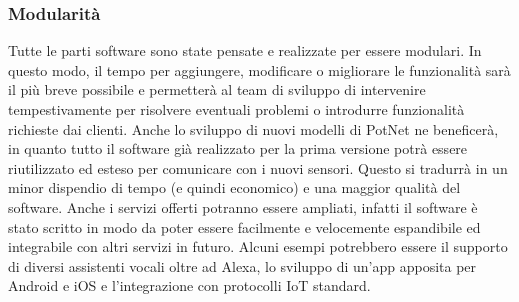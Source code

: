 \subsubsection{Modularità}

Tutte le parti software sono state pensate e realizzate per essere modulari. In questo modo, il tempo per aggiungere, modificare o migliorare le funzionalità sarà il più breve possibile e permetterà al team di sviluppo di intervenire tempestivamente per risolvere eventuali problemi o introdurre funzionalità richieste dai clienti.
\newline Anche lo sviluppo di nuovi modelli di PotNet ne beneficerà, in quanto tutto il software già realizzato per la prima versione potrà essere riutilizzato ed esteso per comunicare con i nuovi sensori. Questo si tradurrà in un minor dispendio di tempo (e quindi economico) e una maggior qualità del software.
\newline\newline Anche i servizi offerti potranno essere ampliati, infatti il software è stato scritto in modo da poter essere facilmente e velocemente espandibile ed integrabile con altri servizi in futuro. Alcuni esempi potrebbero essere il supporto di diversi assistenti vocali oltre ad Alexa, lo sviluppo di un'app apposita per Android e iOS e l'integrazione con protocolli IoT standard.
